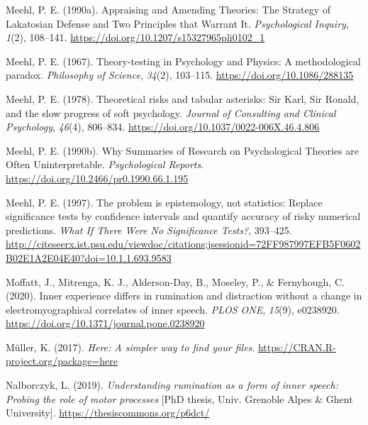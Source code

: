 \documentclass[
  english,
  man, donotrepeattitle,floatsintext]{apa6}
\newlength{\cslhangindent}
\newlength{\cslentryspacingunit} %
\newenvironment{CSLReferences}[2] %
 {%
  \setlength{\parindent}{0pt}
  \ifodd #1
  \let\oldpar\par
  \def\par{\hangindent=\cslhangindent\oldpar}
  \fi
  \setlength{\parskip}{#2\cslentryspacingunit}
 }%
 {}
\begin{document}
\begin{CSLReferences}{1}{0}
\leavevmode{}%
Meehl, P. E. (1990a). Appraising and {Amending Theories}: The {Strategy} of {Lakatosian Defense} and {Two Principles} that {Warrant It}. \emph{Psychological Inquiry}, \emph{1}(2), 108--141. \url{https://doi.org/10.1207/s15327965pli0102_1}

\leavevmode{}%
Meehl, P. E. (1967). Theory-testing in {Psychology} and {Physics}: A methodological paradox. \emph{Philosophy of Science}, \emph{34}(2), 103--115. \url{https://doi.org/10.1086/288135}

\leavevmode{}%
Meehl, P. E. (1978). Theoretical risks and tabular asterisks: Sir {Karl}, {Sir Ronald}, and the slow progress of soft psychology. \emph{Journal of Consulting and Clinical Psychology}, \emph{46}(4), 806--834. \url{https://doi.org/10.1037/0022-006X.46.4.806}

\leavevmode{}%
Meehl, P. E. (1990b). Why {Summaries} of {Research} on {Psychological Theories} are {Often Uninterpretable}. \emph{Psychological Reports}. \url{https://doi.org/10.2466/pr0.1990.66.1.195}

\leavevmode{}%
Meehl, P. E. (1997). The problem is epistemology, not statistics: Replace significance tests by confidence intervals and quantify accuracy of risky numerical predictions. \emph{What If There Were No Significance Tests?}, 393--425. \url{http://citeseerx.ist.psu.edu/viewdoc/citations;jsessionid=72FF987997EFB5F0602B02E1A2E04E40?doi=10.1.1.693.9583}

\leavevmode{}%
Moffatt, J., Mitrenga, K. J., Alderson-Day, B., Moseley, P., \& Fernyhough, C. (2020). Inner experience differs in rumination and distraction without a change in electromyographical correlates of inner speech. \emph{PLOS ONE}, \emph{15}(9), e0238920. \url{https://doi.org/10.1371/journal.pone.0238920}

\leavevmode{}%
Müller, K. (2017). \emph{Here: A simpler way to find your files}. \url{https://CRAN.R-project.org/package=here}

\leavevmode{}%
Nalborczyk, L. (2019). \emph{Understanding rumination as a form of inner speech: Probing the role of motor processes} {[}PhD thesis, {Univ. Grenoble Alpes \& Ghent University}{]}. \url{https://thesiscommons.org/p6dct/}


\end{CSLReferences}
\end{document}
